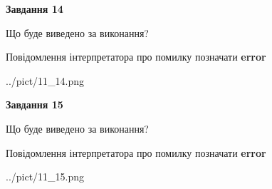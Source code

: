\documentclass[11pt, ukrainian]{article}
\begin{document}
{\begin {large}
{\begin {center}\textbf{Завдання 14}\end {center}}\par
Що буде виведено за виконання? \par
Повідомлення інтерпретатора про помилку позначати \textbf{error}

\begin{center}
	{../pict/11_14.png}
\end{center}
\newpage

{\begin {center}\textbf{Завдання 15}\end {center}}\par
Що буде виведено за виконання? \par
Повідомлення інтерпретатора про помилку позначати \textbf{error}

\begin{center}
	{../pict/11_15.png}
\end{center}
\newpage

\end {large}}
\end{document}
